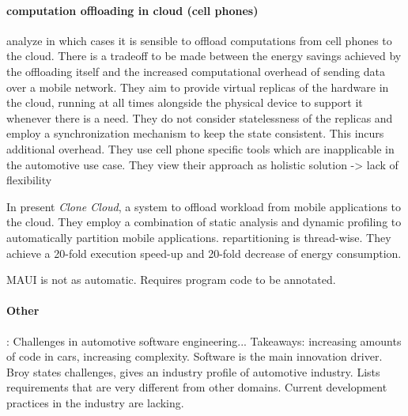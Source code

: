 \paragraph{computation offloading in cloud (cell phones)}
\citeauthor*{barbera2013offload} \cite{barbera2013offload} analyze in which cases it is sensible to offload computations from cell phones to the cloud. There is a tradeoff to be made between the energy savings achieved by the offloading itself and the increased computational overhead of sending data over a mobile network. They aim to provide virtual replicas of the hardware in the cloud, running at all times alongside the physical device to support it whenever there is a need. They do not consider statelessness of the replicas and employ a synchronization mechanism to keep the state consistent. This incurs additional overhead. They use cell phone specific tools which are inapplicable in the automotive use case. They view their approach as holistic solution -> lack of flexibility

In \cite{chun2011clonecloud} \citeauthor*{barbera2013offload} present \emph{Clone Cloud}, a system to offload workload from mobile applications to the cloud. They employ a combination of static analysis and dynamic profiling to automatically partition mobile applications. repartitioning is thread-wise. They achieve a 20-fold execution speed-up and 20-fold decrease of energy consumption.

MAUI is not as automatic. Requires program code to be annotated.

\paragraph{Other}
\citeauthor*{broy2006challenges} \cite{broy2006challenges}: Challenges in automotive software engineering... Takeaways: increasing amounts of code in cars, increasing complexity. Software is the main innovation driver. Broy states challenges, gives an industry profile of automotive industry. Lists requirements that are very different from other domains. Current development practices in the industry are lacking.





